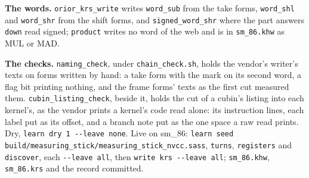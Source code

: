 \textbf{The words.} \texttt{orior\_\allowbreak{}krs\_\allowbreak{}write} writes \texttt{word\_\allowbreak{}sub} from the take forms, \texttt{word\_\allowbreak{}shl} and \texttt{word\_\allowbreak{}shr} from the shift forms, and \texttt{signed\_\allowbreak{}word\_\allowbreak{}shr} where the part answers \texttt{down} read signed; \texttt{product} writes no word of the web and is in \texttt{sm\_\allowbreak{}86.\allowbreak{}khw} as MUL or MAD.

\textbf{The checks.} \texttt{naming\_\allowbreak{}check}, under \texttt{chain\_\allowbreak{}check.\allowbreak{}sh}, holds the vendor's writer's texts on forms written by hand: a take form with the mark on its second word, a flag bit printing nothing, and the frame forms' texts as the first cut measured them. \texttt{cubin\_\allowbreak{}listing\_\allowbreak{}check}, beside it, holds the cut of a cubin's listing into each kernel's, as the vendor prints a kernel's code read alone: its instruction lines, each label put as its offset, and a branch note put as the one space a raw read prints. Dry, \texttt{learn dry 1 -\allowbreak{}-\allowbreak{}leave none}. Live on sm\_\allowbreak{}86: \texttt{learn seed build/\allowbreak{}measuring\_\allowbreak{}stick/\allowbreak{}measuring\_\allowbreak{}stick\_\allowbreak{}nvcc.\allowbreak{}sass}, \texttt{turns}, \texttt{registers} and \texttt{discover}, each \texttt{-\allowbreak{}-\allowbreak{}leave all}, then \texttt{write krs -\allowbreak{}-\allowbreak{}leave all}; \texttt{sm\_\allowbreak{}86.\allowbreak{}khw}, \texttt{sm\_\allowbreak{}86.\allowbreak{}krs} and the record committed.

